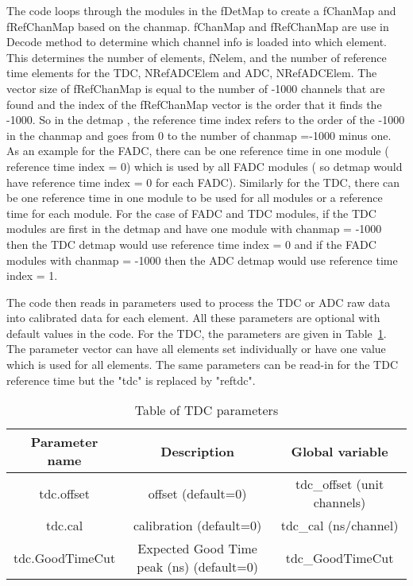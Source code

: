 \documentclass[11pt]{article}
\begin{document}
The code loops through the modules in the fDetMap to create a fChanMap and fRefChanMap based on the chanmap.
 fChanMap and fRefChanMap are use in Decode method to determine which channel info is loaded into which element.
 This determines the number of elements, fNelem, and the number of reference time elements for the TDC,
 NRefADCElem and ADC, NRefADCElem.
The vector size of fRefChanMap is equal to the number of -1000 channels that are found and the index of the
fRefChanMap vector is the order that it finds the -1000. So in the detmap , the reference time index refers
to the order of the -1000 in the chanmap and goes from 0 to the number of chanmap =-1000 minus one.
As an example for the FADC, there can be one reference time in one module ( reference time index = 0)
which is used by all FADC modules ( so detmap would have reference time index = 0 for each FADC).
Similarly for the TDC, there can be one reference time in one module to be used for all modules
or a reference time for each module. For the case of FADC and TDC modules, if the TDC modules
are first in the detmap and have one module with  chanmap = -1000 then the TDC detmap would 
use reference time index = 0 and if the FADC modules with  chanmap = -1000 then the ADC detmap
would use reference time index = 1. 
 
The code then reads in parameters used to process the TDC or ADC raw data into calibrated data
for each element. All these parameters are optional with default values in the code.
 For the TDC, the parameters are given in Table~\ref{tab:tdcparam}. The parameter
 vector can have all elements set individually or have one value which is used for all elements.
 The same parameters can be read-in for the TDC reference time but the "tdc" is replaced by "reftdc".
\begin{table}[h]
\begin{center}
	\begin{tabular}{|c|c|c|}
		\hline 
		Parameter name	& Description &  Global variable\\ 
		\hline
		tdc.offset &  offset (default=0)  & tdc\_offset (unit channels)\\
		\hline
       tdc.cal &  calibration (default=0) & tdc\_cal (ns/channel) \\
		\hline
       tdc.GoodTimeCut &  Expected Good Time peak (ns) (default=0) & tdc\_GoodTimeCut \\
\hline
	\end{tabular} 
\caption{Table of TDC parameters}\label{tab:tdcparam}
\end{center}
\end{table}
\end{document}
